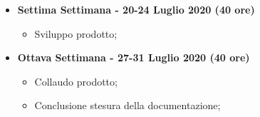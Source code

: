 {\begin{itemize}
\begin{itemize}
        \end{itemize}
        \item \textbf{Settima Settimana - 20-24 Luglio 2020 (40 ore)} 
        \begin{itemize}
            \item Sviluppo prodotto;
        \end{itemize}
        \item \textbf{Ottava Settimana - 27-31 Luglio 2020 (40 ore)} 
        \begin{itemize}
            \item Collaudo prodotto;
            \item Conclusione stesura della documentazione;
        \end{itemize}
    \end{itemize}
}

\newcommand{\totaleOre}{304}

\newcommand{\obiettiviObbligatori}{
	 \item \underline{\textit{O01}}: visualizzazione interattiva volumetrica;
	 \item \underline{\textit{O02}}: possibilità di scelta della funzione di trasferimento dei voxel (colore, trasparenza);
	 
}

\newcommand{\obiettiviDesiderabili}{
	 \item \underline{\textit{D01}}: piani di taglio del volume;
	 \item \underline{\textit{D02}}: modifiche alla funzione taglio;
	 \item \underline{\textit{D03}}: ottimizzazione rendering GPU;
}

\newcommand{\obiettiviFacoltativi}{
	 \item \underline{\textit{F01}}: algoritmi di segmentazione con ITK;
	 \item \underline{\textit{F02}}: analisi unit-testing su GUI-Qt;
	 \item \underline{\textit{F03}}: porting librerie aziendali su CMake;
}